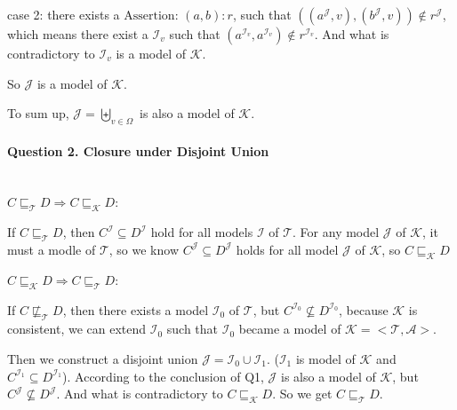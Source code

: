 \documentclass[12pt]{article}
\begin{document}
    case 2: there exists a $\text{Assertion: } (a, b) : r$, such that $((a^{\mathcal{J}}, v), (b^{\mathcal{J}}, v)) \not\in r^{\mathcal{J}}$, which means there exist a $\mathcal{I}_v$ such that $(a^{\mathcal{I}_v}, a^{\mathcal{I}_v}) \not\in r^{\mathcal{I}_v}$. And what is contradictory to $\mathcal{I}_v$ is a model of $\mathcal{K}$. \par
    So $\mathcal{J}$ is a model of $\mathcal{K}$. \par
    To sum up, $\mathcal{J} = \biguplus_{v \in \Omega}$ is also a model of $\mathcal{K}$.
    
    \paragraph{Question 2. Closure under Disjoint Union}~{}
    \\

    $C \sqsubseteq_{\mathcal{T}} D \Longrightarrow  C \sqsubseteq_{\mathcal{K}} D $: \par
	If $C \sqsubseteq_{\mathcal{T}} D$, then $C^{\mathcal{I}} \subseteq D^{\mathcal{I}}$ hold for all models $\mathcal{I}$ of $\mathcal{T}$. For any model $\mathcal{J}$ of $\mathcal{K}$, it must a modle  of $\mathcal{T}$, so we know  $C^{\mathcal{J}} \subseteq D^{\mathcal{J}}$ holds for all model $\mathcal{J}$ of $\mathcal{K}$,
    so $C \sqsubseteq_{\mathcal{K}} D$ \par
    $C \sqsubseteq_{\mathcal{K}} D \Longrightarrow  C \sqsubseteq_{\mathcal{T}} D $: \par
    If $C \not\sqsubseteq_{\mathcal{T}} D$, then there exists a model $\mathcal{I}_0$ of $\mathcal{T}$, but $C^{\mathcal{I}_0} \not\subseteq D^{\mathcal{I}_0}$, because $\mathcal{K}$ is consistent, we can extend $\mathcal{I}_0$ such that $\mathcal{I}_0$ became a model of $\mathcal{K} = <\mathcal{T}, \mathcal{A}>$.\par
    Then we construct a disjoint union $\mathcal{J} = \mathcal{I}_0 \cup \mathcal{I}_1$. ($\mathcal{I}_1$ is model of $\mathcal{K}$ and $C^{\mathcal{I}_1} \subseteq D^{\mathcal{I}_1}$). According to the conclusion of Q1, $\mathcal{J}$ is also a model of $\mathcal{K}$, but $C^{\mathcal{J}} \not\subseteq D^{\mathcal{J}}$. And what is contradictory to $C \sqsubseteq_{\mathcal{K}} D$.
    So we get $C \sqsubseteq_{\mathcal{T}} D$.
\end{document}
